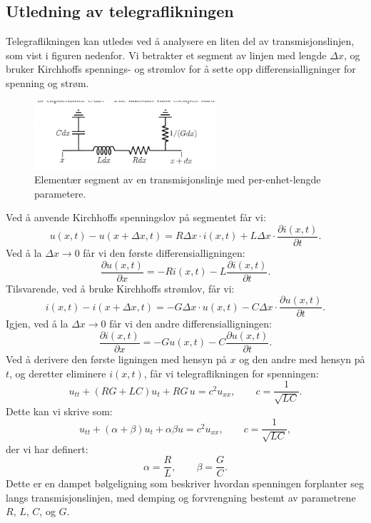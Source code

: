 \subsection{Utledning av telegraflikningen}
Telegraflikningen kan utledes ved å analysere en liten del av transmisjonslinjen, som vist i figuren nedenfor. Vi betrakter et segment av linjen med lengde $\Delta x$, og bruker Kirchhoffs spennings- og strømlov for å sette opp differensialligninger for spenning og strøm.
\begin{figure}[h]
    \centering
    \includegraphics[width=0.6\textwidth]{Media/telegraflinje.png}
    \caption{Elementær segment av en transmisjonslinje med per-enhet-lengde parametere.}
    \label{fig:transmission_line_segment}   
\end{figure}
Ved å anvende Kirchhoffs spenningslov på segmentet får vi:
\begin{equation}
    u(x,t) - u(x+\Delta x,t) = R \Delta x \cdot i(x,t) + L \Delta x \cdot \frac{\partial i(x,t)}{\partial t} .
\end{equation}
Ved å la $\Delta x \to 0$ får vi den første differensialligningen:
\begin{equation}
    \frac{\partial u(x,t)}{\partial x} = -R i(x,t) - L \frac{\partial i(x,t)}{\partial t} . 
\end{equation}
Tilsvarende, ved å bruke Kirchhoffs strømlov, får vi:
\begin{equation}
    i(x,t) - i(x+\Delta x,t) = -G \Delta x \cdot u(x,t) - C \Delta x \cdot \frac{\partial u(x,t)}{\partial t} .
\end{equation}
Igjen, ved å la $\Delta x \to 0$ får vi den andre differensialligningen:
\begin{equation}
    \frac{\partial i(x,t)}{\partial x} = -G u(x,t) - C \frac{\partial u(x,t)}{\partial t} .
\end{equation}
Ved å derivere den første ligningen med hensyn på $x$ og den andre med hensyn på $t$, og deretter eliminere $i(x,t)$, får vi telegraflikningen for spenningen:
\begin{equation}
    u_{tt} + (RG + LC)u_t + RG\,u = c^2 u_{xx}, \qquad c = \frac{1}{\sqrt{LC}} .
\end{equation}
Dette kan vi skrive som:
\begin{equation}
    u_{tt} + (\alpha + \beta)u_t + \alpha \beta u = c^2 u_{xx}, \qquad c = \frac{1}{\sqrt{LC}} ,
\end{equation}
der vi har definert:
\begin{equation}
    \alpha = \frac{R}{L}, \qquad \beta = \frac{G}{C} .
\end{equation}
Dette er en dampet bølgeligning som beskriver hvordan spenningen forplanter seg langs transmisjonslinjen, med demping og forvrengning bestemt av parametrene $R$, $L$, $C$, og $G$.

